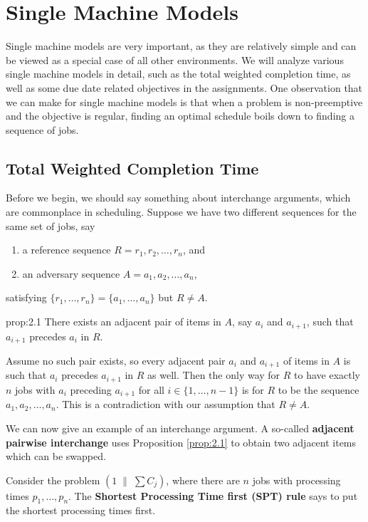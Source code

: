 \section{Single Machine Models}\label{sec:2}
Single machine models are very important, as they are relatively simple 
and can be viewed as a special case of all other environments. We 
will analyze various single machine models in detail, such as 
the total weighted completion time, as well as some due date related 
objectives in the assignments. One observation that we can make for 
single machine models is that when a problem is non-preemptive and the 
objective is regular, finding an optimal schedule boils down to finding 
a sequence of jobs.

\subsection{Total Weighted Completion Time}\label{subsec:2.1}
Before we begin, we should say something about interchange arguments, which 
are commonplace in scheduling. Suppose we have two different sequences 
for the same set of jobs, say 
\begin{enumerate}
    \item a reference sequence $R = r_1, r_2, \dots, r_n$, and 
    \item an adversary sequence $A = a_1, a_2, \dots, a_n$,
\end{enumerate}
satisfying $\{r_1, \dots, r_n\} = \{a_1, \dots, a_n\}$ but $R \neq A$. 

\begin{prop}{prop:2.1}
    There exists an adjacent pair of items in $A$, say $a_i$ and $a_{i+1}$, 
    such that $a_{i+1}$ precedes $a_i$ in $R$. 
\end{prop}
\begin{pf}
    Assume no such pair exists, so every adjacent pair $a_i$ and $a_{i+1}$
    of items in $A$ is such that $a_i$ precedes $a_{i+1}$ in $R$ as well. 
    Then the only way for $R$ to have exactly $n$ jobs with 
    $a_i$ preceding $a_{i+1}$ for all $i \in \{1, \dots, n-1\}$ is 
    for $R$ to be the sequence $a_1, a_2, \dots, a_n$. This is a contradiction 
    with our assumption that $R \neq A$. 
\end{pf}

We can now give an example of an interchange argument. A so-called {\bf adjacent 
pairwise interchange} uses Proposition \ref{prop:2.1} to obtain 
two adjacent items which can be swapped. 

Consider the problem $(1\;\|\;\sum C_j)$, where there are $n$ jobs with 
processing times $p_1, \dots, p_n$. The {\bf Shortest Processing Time 
first (SPT) rule} says to put the shortest processing times first.

